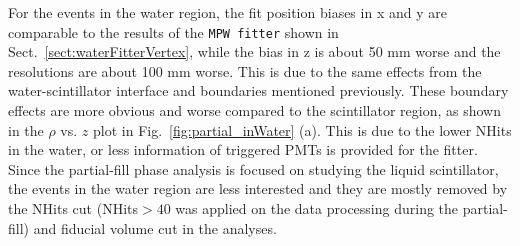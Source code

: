 For the events in the water region, the fit position biases in x and y are comparable to the results of the \texttt{MPW fitter} shown in Sect.~\ref{sect:waterFitterVertex}, while the bias in z is about 50 mm worse and the resolutions are about 100 mm worse. This is due to the same effects from the water-scintillator interface and boundaries mentioned previously. These boundary effects are more obvious and worse compared to the scintillator region, as shown in the $\rho$ vs. $z$ plot in Fig.~\ref{fig:partial_inWater} (a). This is due to the lower NHits in the water, or less information of triggered PMTs is provided for the fitter. Since the partial-fill phase analysis is focused on studying the liquid scintillator, the events in the water region are less interested and they are mostly removed by the NHits cut (NHits$>40$ was applied on the data processing during the partial-fill) and fiducial volume cut in the analyses.

